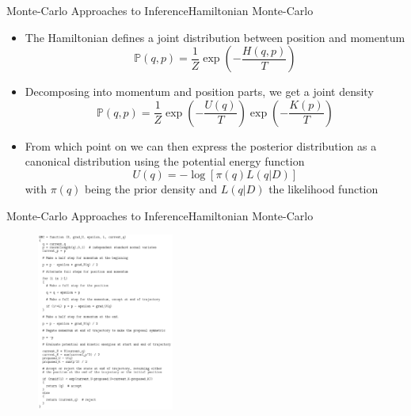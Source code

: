 \documentclass[AERbeamer%
              ,optEnglish%
              ,optBiber%
              ,optBibstyleAlphabetic%
              ,optBeamerClassicFormat%
              ]{AERlatex}%
\begin{document}
\begin{frame}[c]{Monte-Carlo Approaches to Inference}{Hamiltonian Monte-Carlo}
    \centering
    \begin{itemize}
        \item The Hamiltonian defines a joint distribution between position and momentum
        \begin{equation*}
            \mathbb{P}(q, p) = \frac{1}{Z} \exp \left( -\frac{H(q, p)}{T} \right)
        \end{equation*}
        \item Decomposing into momentum and position parts, we get a joint density
        \begin{equation*}
            \mathbb{P}(q, p) = \frac{1}{Z} \exp \left( - \frac{U(q)}{T} \right) \exp \left( - \frac{K(p)}{T} \right)
        \end{equation*}
        \item From which point on we can then express the posterior distribution as a canonical
              distribution using the potential energy function
        \begin{equation*}
            U(q) = - \log \left[ \pi(q) L(q | D) \right]
        \end{equation*}
              with $\pi(q)$ being the prior density and $L(q | D)$ the likelihood function
    \end{itemize}
\end{frame}


\begin{frame}[c]{Monte-Carlo Approaches to Inference}{Hamiltonian Monte-Carlo}
    \centering
    \begin{figure}
        \centering
        \includegraphics[width=0.4\textwidth]{HMCAlgo.png}
    \end{figure}
\end{frame}
\end{document}
